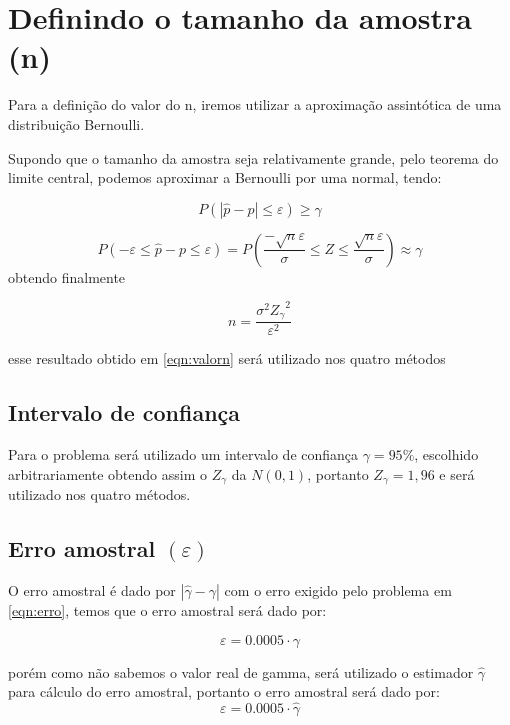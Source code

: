\documentclass{article}
\begin{document}
\section{Definindo o tamanho da amostra (n)}

Para a definição do valor do n, iremos utilizar a aproximação assintótica de uma distribuição Bernoulli.

Supondo que o tamanho da amostra seja relativamente grande, pelo teorema do limite central, podemos aproximar a Bernoulli por uma normal, tendo:

\[
P(|\hat{p} - p|\leq \varepsilon)\geq \gamma 
\] \cite{estatbas}

\[
P(-\varepsilon \leq \hat{p} - p \leq \varepsilon) = P\left( \frac{-\sqrt{n}\varepsilon}{\sigma} \leq Z \leq \frac{\sqrt{n}\varepsilon}{\sigma}\right) \approx \gamma
\]
obtendo finalmente 

\begin{equation}
    n = \frac {\sigma^2 {Z_\gamma}^2} {\varepsilon^2}
    \label{eqn:valorn}
\end{equation}

esse resultado obtido em \ref{eqn:valorn} será utilizado nos quatro métodos

\subsection{Intervalo de confiança}
Para o problema será utilizado um intervalo de confiança $\gamma = 95\%$, escolhido arbitrariamente obtendo assim o $Z_\gamma$ da $N(0,1)$, portanto $Z_\gamma = 1,96$ e será utilizado nos quatro métodos.

\subsection{Erro amostral $(\varepsilon)$}

O erro amostral é dado por $|\hat{\gamma}-{\gamma}|$ com o erro exigido pelo problema em \ref{eqn:erro}, temos que o erro amostral será dado por:

\begin{equation*}
    \varepsilon = 0.0005\cdot\gamma
\end{equation*}

porém como não sabemos o valor real de gamma, será utilizado o estimador $\hat{\gamma}$ para cálculo do erro amostral, portanto o erro amostral será dado por:
\begin{equation}
    \varepsilon = 0.0005\cdot\hat{\gamma}
    \label{eqn:erroamostral}
\end{equation}
\end{document}
